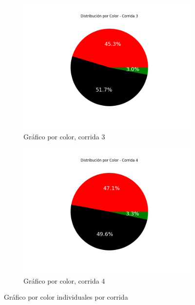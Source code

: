\documentclass{article}
\begin{document}
\begin{figure}[H]
    \vspace{0.5cm}
    
    \begin{subfigure}[b]{0.45\textwidth}
        \centering
        \includegraphics[width=\textwidth]{Imagenes/GraficoColor_corrida_3.png}
        \caption{Gráfico por color, corrida 3}
    \end{subfigure}
    \hfill
    \begin{subfigure}[b]{0.45\textwidth}
        \centering
        \includegraphics[width=\textwidth]{Imagenes/GraficoColor_corrida_4.png}
        \caption{Gráfico por color, corrida 4}
    \end{subfigure}

    \caption{Gráfico por color individuales por corrida}
    \label{fig:collage}
\end{figure}
\end{document}

